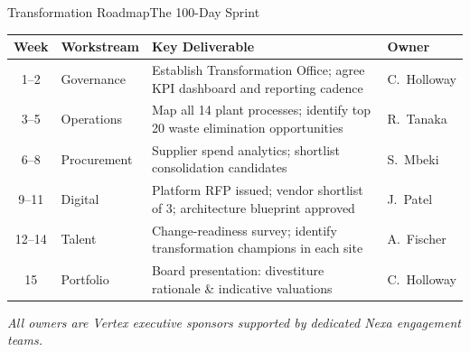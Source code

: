 \begin{frame}{Transformation Roadmap}{The 100-Day Sprint}
  \vspace{0.1cm}
  \begin{center}
  \renewcommand{\arraystretch}{1.28}
  \begin{tabular}{clp{5.8cm}l}
    \toprule
    \rowcolor{NexaNavy}
    \textcolor{NexaWhite}{\textbf{Week}} &
    \textcolor{NexaWhite}{\textbf{Workstream}} &
    \textcolor{NexaWhite}{\textbf{Key Deliverable}} &
    \textcolor{NexaWhite}{\textbf{Owner}} \\
    \midrule
    1--2   & Governance      & Establish Transformation Office; agree
                               KPI dashboard and reporting cadence            & C.\ Holloway \\
    \rowcolor{NexaLight}
    3--5   & Operations      & Map all 14 plant processes;
                               identify top 20 waste elimination opportunities & R.\ Tanaka \\
    6--8   & Procurement     & Supplier spend analytics; shortlist
                               consolidation candidates                        & S.\ Mbeki \\
    \rowcolor{NexaLight}
    9--11  & Digital         & Platform RFP issued; vendor shortlist
                               of 3; architecture blueprint approved           & J.\ Patel \\
    12--14 & Talent          & Change-readiness survey; identify
                               transformation champions in each site           & A.\ Fischer \\
    \rowcolor{NexaLight}
    15     & Portfolio       & Board presentation: divestiture rationale
                               \& indicative valuations                       & C.\ Holloway \\
    \bottomrule
  \end{tabular}
  \end{center}
  \vspace{0.1cm}
  \scriptsize\textcolor{NexaSlate}{\textit{All owners are Vertex executive sponsors supported by dedicated Nexa engagement teams.}}
\end{frame}
